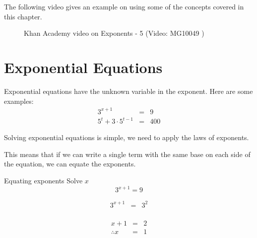 The following video gives an example on using some of the concepts covered in this chapter.
\setcounter{subfigure}{0}
\begin{figure}[H] %
\textnormal{Khan Academy video on Exponents - 5}\vspace{.1in} \nopagebreak
\label{m38359*yt-media5}\label{m38359*yt-video5}
 { (Video:  MG10049 )}
\end{figure}    


\section{Exponential Equations}

Exponential equations have the unknown variable in the exponent. Here are some examples:
\begin{eqnarray*}
 3^{x+1} & = & 9 \\
5^t + 3 \cdot 5^{t-1} & = & 400
\end{eqnarray*}

Solving exponential equations is simple, we need to apply the laws of exponents.



This means that if we can write a single term with the same base on each side of the equation, we can equate the exponents.


\begin{wex}
{%
Equating exponents
}
{%
Solve $x$
$$ 3^{x+1} = 9 $$
}
{%

\begin{eqnarray*}
 3^{x+1} & = & 3^2 \\
\end{eqnarray*}

\begin{eqnarray*}
 {x+1} & = & 2 \\
\therefore x & = & 1
\end{eqnarray*}
}
\end{wex}

